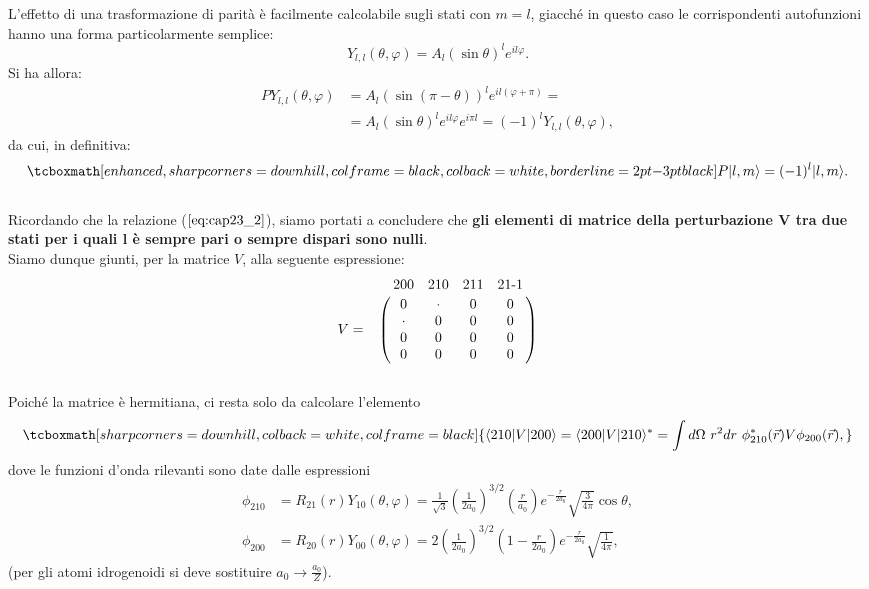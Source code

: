 L'effetto di una trasformazione di parità è facilmente calcolabile sugli stati con $m=l$, giacché in questo caso le corrispondenti autofunzioni hanno una forma particolarmente semplice:
	\begin{equation} 
		Y_{l,l}(\theta, \varphi)=A_l \left( \sin \theta \right)^l e^{il\varphi}.
	\end{equation}
Si ha allora:
	\begin{align} 
		PY_{l,l}(\theta, \varphi) & =   A_l \left( \sin (\pi -\theta) \right)^l e^{il(\varphi+\pi)}= \nonumber \\
		 & =   A_l \left( \sin \theta \right)^l e^{il\varphi} e^{i \pi l}= (-1)^l Y_{l,l}(\theta, \varphi),
	\end{align}
da cui, in definitiva:
	\begin{equation} 
		\tcboxmath[enhanced, sharp corners=downhill, colframe=black, colback=white, borderline={2pt}{-3pt}{black}]{
			P|l,m\rangle= (-1)^l |l,m \rangle.
			}
	\end{equation}\\
	
Ricordando che la relazione ($\ref{eq:cap23_2}$), siamo portati a concludere che \textbf{gli elementi di matrice della perturbazione $\boldsymbol{V}$ tra due stati per i quali $\boldsymbol{l}$ è sempre pari o sempre dispari sono nulli}.\\

Siamo dunque giunti, per la matrice $V$, alla seguente espressione:
	\begin{equation}  
		V=
			\bordermatrix{~&200&210&211&21\textrm{-}1\cr
			& 0 & \cdot & 0 & 0 \cr
			& \cdot & 0 & 0 & 0 \cr
			& 0 & 0 & 0 & 0 \cr
			& 0 & 0 & 0 & 0 \cr}
	\end{equation}\\

Poiché la matrice è hermitiana, ci resta solo da calcolare l'elemento 
	\begin{equation}
	\label{eq:cap23_3}
		\tcboxmath[sharp corners=downhill, colback=white, colframe=black]{
			\langle 210| V |200 \rangle =  \langle 200| V |210 \rangle^* = \int d\Omega \ r^2 dr \ \phi_{210}^*(\vec{r}) V \phi_{200}(\vec{r}),
			}
	\end{equation}
dove le funzioni d'onda rilevanti sono date dalle espressioni
	\begin{align} 
		\phi_{210}& = R_{21}(r)Y_{10}(\theta, \varphi)=  \frac{1}{\sqrt{3}}\left( \frac{1}{2a_0} \right)^{3/2} \left( \frac{r}{a_0} \right) e^{-\frac{r}{2a_0}} \sqrt{\frac{3}{4 \pi}} \cos \theta , \\
		\phi_{200}& =  R_{20}(r)Y_{00}(\theta, \varphi)= 2\left( \frac{1}{2a_0} \right)^{3/2} \left( 1-\frac{r}{2a_0} \right) e^{-\frac{r}{2a_0}} \sqrt{\frac{1}{4 \pi}} ,
	\end{align}
(per gli atomi idrogenoidi si deve sostituire $a_0 \to \frac{a_0}{Z}$).\\

